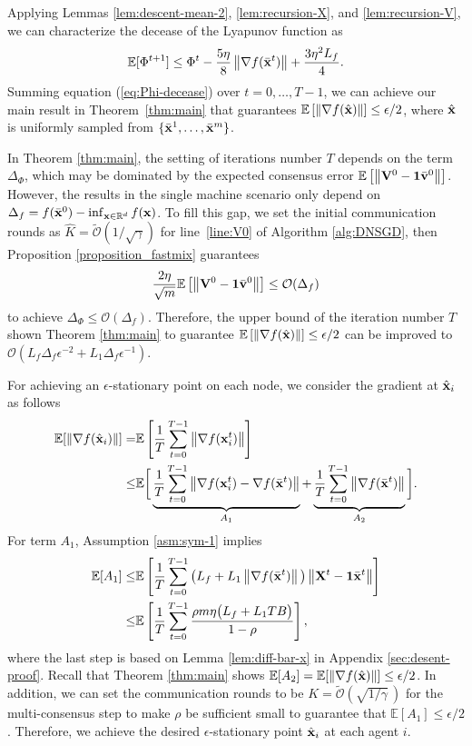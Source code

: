 \documentclass[sigconf]{acmart}
\newcommand{\Norm}[1]{\left\| #1 \right\|}
\def\vone{{\bf{1}}}
\def\vv{{\bf{v}}}
\def\vx{{\bf{x}}}
\def\fO{{\mathcal{O}}}
\def\BE{{\mathbb{E}}}
\def\BR{{\mathbb{R}}}
\def\mV {{\bf V}}
\def\mX {{\bf X}}
\theoremstyle{plain}
\def\bx{{\bar\vx}}
\def\bv{{\bar\vv}}
\begin{document}
Applying Lemmas \ref{lem:descent-mean-2}, \ref{lem:recursion-X}, and \ref{lem:recursion-V}, we can characterize the decease of the Lyapunov function as 
\begin{align}\label{eq:Phi-decease}    
 \BE[\Phi^{t+1}]
\leq  \Phi^t - \frac{5\eta}{8}\Norm{\nabla f(\bx^t)} + \frac{3\eta^2L_f}{4}.
\end{align}
Summing equation (\ref{eq:Phi-decease}) over $t=0,\dots,T-1$, 
we can achieve our main result in Theorem~\ref{thm:main} that 
guarantees $\BE\left[\Norm{\nabla f(\hat\vx)}\right] \leq \epsilon/2$, where $\hat\vx$ is uniformly sampled from $\{\bx^1,\dots,\bx^m\}$. 

In Theorem \ref{thm:main}, the setting of iterations number $T$
depends on the term $\Delta_{\Phi}$, which may be dominated by the expected consensus error $\BE\left[\Norm{\mV^0-\vone\bv^0}\right]$.
However, the results in the single machine scenario only depend on $\Delta_f=f(\bx^0) - \inf_{\vx\in\BR^d}f(\vx)$.
To fill this gap, we set the initial communication rounds as $\hat K=\tilde\fO(1/\sqrt{\gamma})$ for line~\ref{line:V0} of Algorithm \ref{alg:DNSGD}, then Proposition \ref{proposition_fastmix} guarantees 
\begin{align*}
\frac{2\eta}{\sqrt{m}}\BE\left[\Norm{\mV^0-\vone\bv^0}\right]\leq \fO(\Delta_f)     
\end{align*}
to achieve $\Delta_{\Phi}\leq \fO(\Delta_f)$.
Therefore, the upper bound of the iteration number $T$ shown Theorem \ref{thm:main} to guarantee $\BE\left[\Norm{\nabla f(\hat\vx)}\right] \leq \epsilon/2$ can be improved to 
$\fO(L_f\Delta_f\epsilon^{-2}+L_1\Delta_f\epsilon^{-1})$.

For achieving an $\epsilon$-stationary point on each node, 
we consider the gradient at $\hat\vx_i$ as follows
\begin{align*}
 \BE[\Norm{\nabla f(\hat\vx_i)}] 
=&  \BE\left[\frac{1}{T}\sum_{t=0}^{T-1}\Norm{\nabla f(\vx_i^t)}\right]  \\
\leq & \BE\bigg[\underbrace{\frac{1}{T}\sum_{t=0}^{T-1}\Norm{\nabla f(\vx_i^t)-\nabla f(\bx^t)}}_{A_1} + \underbrace{\frac{1}{T}\sum_{t=0}^{T-1}\Norm{\nabla f(\bx^t)}}_{A_2}\bigg].
\end{align*}
For term $A_1$, Assumption \ref{asm:sym-1} implies
\begin{align*}
\BE[A_1] 
\leq & \BE\left[\frac{1}{T}\sum_{t=0}^{T-1}\big(L_f+L_1\Norm{\nabla f(\bx^t)}\big)\Norm{\mX^t - \vone\bx^t
}\right]  \\
\leq & \BE\left[\frac{1}{T}\sum_{t=0}^{T-1}\frac{\rho m\eta\big(L_f+L_1TB\big)}{1-\rho}\right],
\end{align*}
where the last step is based on 
Lemma \ref{lem:diff-bar-x} in Appendix \ref{sec:desent-proof}. 
Recall that Theorem \ref{thm:main} shows $\BE[A_2]=\BE[\Norm{\nabla f(\hat\vx)}]\leq\epsilon/2$.
In addition, we can set the communication rounds to be $K=\tilde\fO(\sqrt{1/\gamma}\,)$ for the multi-consensus step  to make $\rho$ be sufficient small to guarantee that $\BE[A_1]\leq\epsilon/2$.
Therefore, we achieve the desired $\epsilon$-stationary point $\hat\vx_i$ at each agent $i$. 
\end{document}

